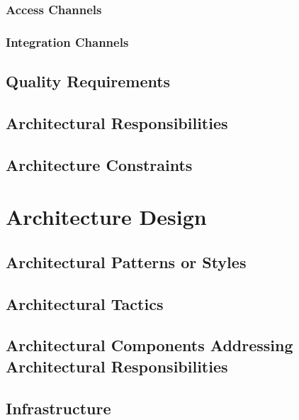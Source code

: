 \documentclass[11pt,a4paper]{report}
\begin{document}
\subsubsection{Access Channels}


\subsubsection{Integration Channels}


\subsection{Quality Requirements}


\subsection{Architectural Responsibilities}


\subsection{Architecture Constraints}
\label{sec:systemArchitecturalConstraints}


\section{Architecture Design}
\subsection{Architectural Patterns or Styles}


\subsection{Architectural Tactics}

\subsection{Architectural Components Addressing Architectural Responsibilities}


\subsection{Infrastructure}
\end{document}
